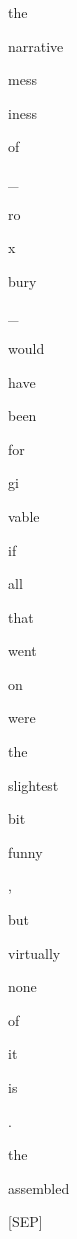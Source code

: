 \documentclass[varwidth=150mm]{standalone}
\begin{document}
\begin{CJK*}{UTF8}{gbsn}
{{{\colorbox{red!34.40842056274414}{\strut the} \colorbox{red!16.979705810546875}{\strut narrative} \colorbox{red!1.4869662523269653}{\strut mess}\colorbox{red!3.9961907863616943}{\strut iness} \colorbox{red!22.42618179321289}{\strut of} \colorbox{red!34.193912506103516}{\strut \_} \colorbox{red!1.002483606338501}{\strut ro}\colorbox{red!11.591798782348633}{\strut x}\colorbox{red!27.611440658569336}{\strut bury} \colorbox{red!78.25670623779297}{\strut \_} \colorbox{red!3.4205760955810547}{\strut would} \colorbox{red!7.609256744384766}{\strut have} \colorbox{red!2.5750234127044678}{\strut been} \colorbox{red!1.2056142091751099}{\strut for}\colorbox{red!0.0}{\strut gi}\colorbox{red!2.0803561210632324}{\strut vable} \colorbox{red!0.0}{\strut if} \colorbox{red!0.0}{\strut all} \colorbox{red!1.2049473524093628}{\strut that} \colorbox{red!0.0}{\strut went} \colorbox{red!0.0}{\strut on} \colorbox{red!0.0}{\strut were} \colorbox{red!0.0}{\strut the} \colorbox{red!0.0}{\strut slightest} \colorbox{red!0.0}{\strut bit} \colorbox{red!1.0437626838684082}{\strut funny} \colorbox{red!0.0}{\strut ,} \colorbox{red!14.168275833129883}{\strut but} \colorbox{red!8.57384967803955}{\strut virtually} \colorbox{red!0.0}{\strut none} \colorbox{red!5.93320369720459}{\strut of} \colorbox{red!14.578633308410645}{\strut it} \colorbox{red!15.805418014526367}{\strut is} \colorbox{red!0.0}{\strut .} \colorbox{red!48.6649284362793}{\strut the} \colorbox{red!32.35311508178711}{\strut assembled} \colorbox{red!21.76789093017578}{\strut [SEP]}
}}}
\end{CJK*}
\end{document}
